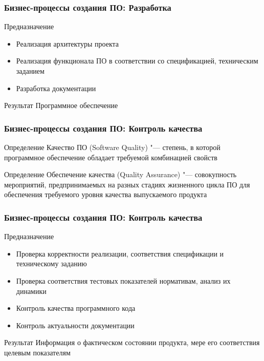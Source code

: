 \documentclass{../industrial-development}
\begin{document}
\begin{frame} \frametitle{Бизнес-процессы создания ПО: Разработка}
	\begin{block}{Предназначение}
		\begin{itemize}
			\item Реализация архитектуры проекта
			\item Реализация функционала ПО в соответствии со спецификацией, техническим заданием
			\item Разработка документации
		\end{itemize}
	\end{block}
	\begin{block}{Результат}
		Программное обеспечение
	\end{block}
\end{frame}
\lecturenotes


\begin{frame} \frametitle{Бизнес-процессы создания ПО: Контроль качества}
	\begin{block}{Определение}
		\alert{Качество ПО} (Software Quality) "--- степень, в которой программное обеспечение обладает требуемой комбинацией свойств
	\end{block}
	\begin{block}{Определение}
		\alert{Обеспечение качества} (Quality Assurance) "--- совокупность мероприятий, предпринимаемых на разных стадиях жизненного цикла ПО для обеспечения требуемого уровня качества выпускаемого продукта
	\end{block}
\end{frame}
\lecturenotes


\begin{frame} \frametitle{Бизнес-процессы создания ПО: Контроль качества}
	\begin{block}{Предназначение}
		\begin{itemize}
			\item Проверка корректности реализации, соответствия спецификации и техническому заданию
			\item Проверка соответствия тестовых показателей нормативам, анализ их динамики
			\item Контроль качества программного кода
			\item Контроль актуальности документации
		\end{itemize}
	\end{block}
	\begin{block}{Результат}
		Информация о фактическом состоянии продукта, мере его соответствия целевым показателям
	\end{block}
\end{frame}
\lecturenotes
\end{document}

